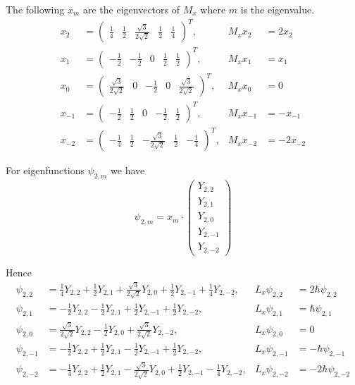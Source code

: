 The following $x_m$ are the eigenvectors of $M_x$ where $m$ is the eigenvalue.
\begin{align*}
x_2&=\begin{pmatrix}
\frac{1}{4} & \frac{1}{2} & \frac{\sqrt3}{2\sqrt2} & \frac{1}{2} & \frac{1}{4}
\end{pmatrix}^T, & M_xx_2&=2x_2
\\[1ex]
x_1&=\begin{pmatrix}
-\frac{1}{2} & -\frac{1}{2} & 0 & \frac{1}{2} & \frac{1}{2}
\end{pmatrix}^T, & M_xx_1&=x_1
\\[1ex]
x_0&=\begin{pmatrix}
\frac{\sqrt3}{2\sqrt2} & 0 & -\frac{1}{2} & 0 & \frac{\sqrt3}{2\sqrt2}
\end{pmatrix}^T, & M_xx_0&=0
\\[1ex]
x_{-1}&=\begin{pmatrix}
-\frac{1}{2} & \frac{1}{2} & 0 & -\frac{1}{2} & \frac{1}{2}
\end{pmatrix}^T, & M_xx_{-1}&=-x_{-1}
\\[1ex]
x_{-2}&=\begin{pmatrix}
-\frac{1}{4} & \frac{1}{2} & -\frac{\sqrt3}{2\sqrt2} & \frac{1}{2} & -\frac{1}{4}
\end{pmatrix}^T, & M_xx_{-2}&=-2x_{-2}
\end{align*}

For eigenfunctions $\psi_{2,m}$ we have
\begin{equation*}
\psi_{2,m}=x_m\cdot\begin{pmatrix}Y_{2,2}\\[1ex]Y_{2,1}\\[1ex]Y_{2,0}\\[1ex]Y_{2,-1}\\[1ex]Y_{2,-2}\end{pmatrix}
\end{equation*}

Hence
\begin{align*}
\psi_{2,2}&=\frac{1}{4}Y_{2,2}+\frac{1}{2}Y_{2,1}+\frac{\sqrt3}{2\sqrt2}Y_{2,0}
+\frac{1}{2}Y_{2,-1}+\frac{1}{4}Y_{2,-2}, & L_x\psi_{2,2}&=2\hbar\psi_{2,2}
\\[1ex]
\psi_{2,1}&=-\frac{1}{2}Y_{2,2}-\frac{1}{2}Y_{2,1}
+\frac{1}{2}Y_{2,-1}+\frac{1}{2}Y_{2,-2}, & L_x\psi_{2,1}&=\hbar\psi_{2,1}
\\[1ex]
\psi_{2,0}&=\frac{\sqrt3}{2\sqrt2}Y_{2,2}
-\frac{1}{2}Y_{2,0}+\frac{\sqrt3}{2\sqrt2}Y_{2,-2}, & L_x\psi_{2,0}&=0
\\[1ex]
\psi_{2,-1}&=-\frac{1}{2}Y_{2,2}+\frac{1}{2}Y_{2,1}
-\frac{1}{2}Y_{2,-1}+\frac{1}{2}Y_{2,-2}, & L_x\psi_{2,-1}&=-\hbar\psi_{2,-1}
\\[1ex]
\psi_{2,-2}&=-\frac{1}{4}Y_{2,2}+\frac{1}{2}Y_{2,1}-\frac{\sqrt3}{2\sqrt2}Y_{2,0}
+\frac{1}{2}Y_{2,-1}-\frac{1}{4}Y_{2,-2}, & L_x\psi_{2,-2}&=-2\hbar\psi_{2,-2}
\end{align*}


